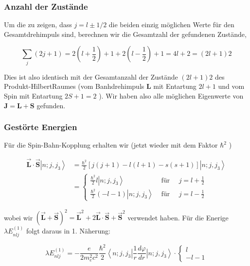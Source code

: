 \documentclass[10pt, letterpaper]{article}
\begin{document}
\subsubsection*{Anzahl der Zustände}
Um die zu zeigen, dass $j=l \pm 1 / 2$ die beiden einzig möglichen Werte für den Gesamtdrehimpuls sind, berechnen wir die Gesamtzahl der gefundenen Zustände,

$$
\sum_{j}(2 j+1)=2\left(l+\frac{1}{2}\right)+1+2\left(l-\frac{1}{2}\right)+1=4 l+2=(2 l+1) 2
$$

Dies ist also identisch mit der Gesamtanzahl der Zustände $(2 l+1) 2$ des Produkt-HilbertRaumes (vom Banhdrehimpuls $\mathbf{L}$ mit Entartung $2 l+1$ und vom Spin mit Entartung $2 S+1=2$ ). Wir haben also alle möglichen Eigenwerte von $\mathbf{J}=\mathbf{L}+\mathbf{S}$ gefunden.

\subsubsection*{Gestörte Energien}
Für die Spin-Bahn-Kopplung erhalten wir (jetzt wieder mit dem Faktor $\hbar^{2}$ )

$$
\begin{aligned}
\overrightarrow{\mathbf{L}} \cdot \overrightarrow{\mathbf{S}}\left|n ; j, j_{3}\right\rangle & =\frac{\hbar^{2}}{2}[j(j+1)-l(l+1)-s(s+1)]\left|n ; j, j_{3}\right\rangle \\
& =\left\{\begin{array}{rr}
\frac{\hbar^{2}}{2} l\left|n ; j, j_{3}\right\rangle & \text { für } \quad j=l+\frac{1}{2} \\
\frac{\hbar^{2}}{2}(-l-1)\left|n ; j, j_{3}\right\rangle & \text { für } \quad j=l-\frac{1}{2}
\end{array}\right.
\end{aligned}
$$

wobei wir $(\overrightarrow{\mathbf{L}}+\overrightarrow{\mathbf{S}})^{2}=\overrightarrow{\mathbf{L}}^{2}+2 \overrightarrow{\mathbf{L}} \cdot \overrightarrow{\mathbf{S}}+\overrightarrow{\mathbf{S}}^{2}$ verwendet haben. Für die Enerige $\lambda E_{n l j}^{(1)}$ folgt daraus in 1. Näherung:

$$
\lambda E_{n l j}^{(1)}=-\frac{e}{2 m_{e}^{2} c^{2}} \frac{\hbar^{2}}{2}\left\langle n ; j, j_{3}\right| \frac{1}{r} \frac{d \varphi}{d r}\left|n ; j, j_{3}\right\rangle \cdot\left\{\begin{array}{c}
l \\
-l-1
\end{array}\right.
$$
\end{document}

